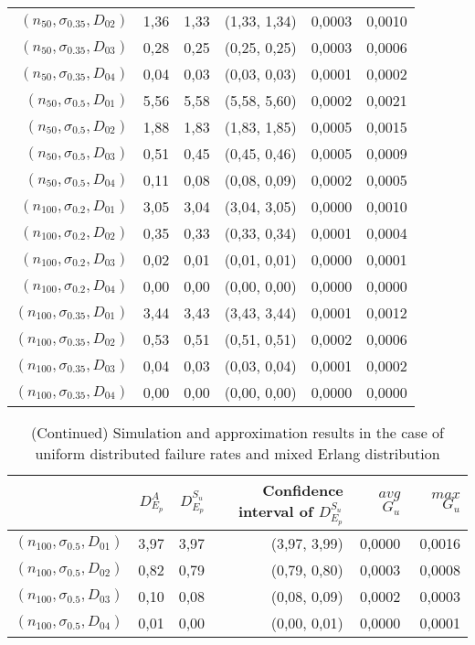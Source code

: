 \documentclass[preprint,12pt]{elsarticle}
\begin{document}
\begin{appendices}
\begin{table}[htbp]
\begin{tabular}{rrrcrr}
 $(n_{50},\sigma_{0.35},D_{02})$ & 1,36  & 1,33  & (1,33, 1,34) & 0,0003 & 0,0010 \\
 $(n_{50},\sigma_{0.35},D_{03})$ & 0,28  & 0,25  & (0,25, 0,25) & 0,0003 & 0,0006 \\
 $(n_{50},\sigma_{0.35},D_{04})$& 0,04  & 0,03  & (0,03, 0,03) & 0,0001 & 0,0002 \\
 $(n_{50},\sigma_{0.5},D_{01})$ & 5,56  & 5,58  & (5,58, 5,60) & 0,0002 & 0,0021 \\
 $(n_{50},\sigma_{0.5},D_{02})$ & 1,88  & 1,83  & (1,83, 1,85) & 0,0005 & 0,0015 \\
 $(n_{50},\sigma_{0.5},D_{03})$  & 0,51  & 0,45  & (0,45, 0,46) & 0,0005 & 0,0009 \\
 $(n_{50},\sigma_{0.5},D_{04})$ & 0,11  & 0,08  & (0,08, 0,09) & 0,0002 & 0,0005 \\
 $(n_{100},\sigma_{0.2},D_{01})$ & 3,05  & 3,04  & (3,04, 3,05) & 0,0000 & 0,0010 \\
 $(n_{100},\sigma_{0.2},D_{02})$  & 0,35  & 0,33  & (0,33, 0,34) & 0,0001 & 0,0004 \\
 $(n_{100},\sigma_{0.2},D_{03})$  & 0,02  & 0,01  & (0,01, 0,01) & 0,0000 & 0,0001 \\
 $(n_{100},\sigma_{0.2},D_{04})$ & 0,00  & 0,00  & (0,00, 0,00) & 0,0000 & 0,0000 \\
  $(n_{100},\sigma_{0.35},D_{01})$  & 3,44  & 3,43  & (3,43, 3,44) & 0,0001 & 0,0012 \\
 $(n_{100},\sigma_{0.35},D_{02})$ & 0,53  & 0,51  & (0,51, 0,51) & 0,0002 & 0,0006 \\
 $(n_{100},\sigma_{0.35},D_{03})$ & 0,04  & 0,03  & (0,03, 0,04) & 0,0001 & 0,0002 \\
 $(n_{100},\sigma_{0.35},D_{04})$& 0,00  & 0,00  & (0,00, 0,00) & 0,0000 & 0,0000 \\
    \bottomrule
    \end{tabular}%
  \label{uniform1}%
\end{table}%
\begin{table}[htbp]
  \centering
  \caption{(Continued) Simulation and approximation results in the case of uniform distributed failure rates and mixed Erlang distribution}
    \begin{tabular}{rrrrrr}
     \toprule
    & $D_{E_{p}}^{A}$ & $D_{E_{p}}^{S_{u}}$ & Confidence interval of $D_{E_{p}}^{S_{u}}$ & $avg$ $G_{u}$ & $max$ $G_{u}$ \\
    \midrule
 $(n_{100},\sigma_{0.5},D_{01})$  & 3,97  & 3,97  & (3,97, 3,99) & 0,0000 & 0,0016 \\
 $(n_{100},\sigma_{0.5},D_{02})$ & 0,82  & 0,79  & (0,79, 0,80) & 0,0003 & 0,0008 \\
 $(n_{100},\sigma_{0.5},D_{03})$& 0,10  & 0,08  & (0,08, 0,09) & 0,0002 & 0,0003 \\
 $(n_{100},\sigma_{0.5},D_{04})$ & 0,01  & 0,00  & (0,00, 0,01) & 0,0000 & 0,0001 \\
    \bottomrule
    \end{tabular}%
  \label{uniform2}%
\end{table}%


\end{appendices}
\end{document}
